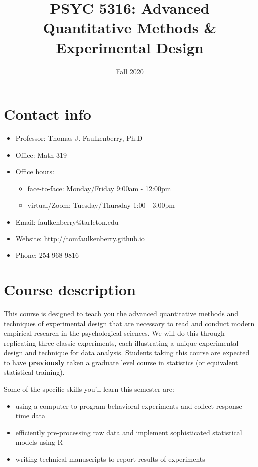 \documentclass[10pt]{article}
\date{Fall 2020}
\title{PSYC 5316: Advanced Quantitative Methods \& Experimental Design}
\begin{document}
\maketitle

\section*{Contact info}
\label{sec:org4e52996}
\begin{itemize}
\item Professor: Thomas J. Faulkenberry, Ph.D
\item Office: Math 319
\item Office hours: 
\begin{itemize}
\item face-to-face: Monday/Friday 9:00am - 12:00pm
\item virtual/Zoom: Tuesday/Thursday 1:00 - 3:00pm
\end{itemize}
\item Email: faulkenberry@tarleton.edu
\item Website: \url{http://tomfaulkenberry.github.io}
\item Phone: 254-968-9816
\end{itemize}

\section*{Course description}
\label{sec:orga4a7835}

This course is designed to teach you the advanced quantitative methods and techniques of experimental design that are necessary to read and conduct modern empirical research in the psychological sciences. We will do this through replicating three classic experiments, each illustrating a unique experimental design and technique for data analysis.  Students taking this course are expected to have \textbf{previously} taken a graduate level course in statistics (or equivalent statistical training). 

Some of the specific skills you'll learn this semester are:
\begin{itemize}
\item using a computer to program behavioral experiments and collect response time data
\item efficiently pre-processing raw data and implement sophisticated statistical models using R
\item writing technical manuscripts to report results of experiments
\end{itemize}
\end{document}
